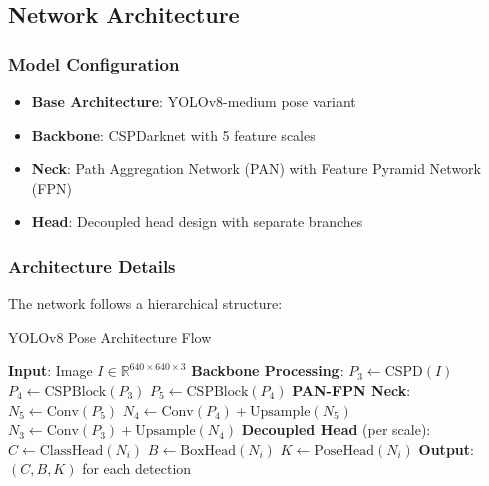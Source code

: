 \documentclass[11pt]{article}
\begin{document}
\subsection{Network Architecture}

\subsubsection{Model Configuration}

\begin{itemize}[noitemsep]
    \item \textbf{Base Architecture}: YOLOv8-medium pose variant
    \item \textbf{Backbone}: CSPDarknet with 5 feature scales 
    \item \textbf{Neck}: Path Aggregation Network (PAN) \cite{liu_path_2018} with Feature Pyramid Network (FPN) \cite{lin_feature_2017}
    \item \textbf{Head}: Decoupled head design with separate branches
\end{itemize}

\subsubsection{Architecture Details}

The network follows a hierarchical structure:

\begin{algorithm}
\caption{YOLOv8 Pose Architecture Flow}
\begin{algorithmic}[1]
\STATE \textbf{Input}: Image $I \in \mathbb{R}^{640 \times 640 \times 3}$
\STATE \textbf{Backbone Processing}:
\STATE \quad $P_3 \leftarrow \text{CSPD}(I)$ 
\STATE \quad $P_4 \leftarrow \text{CSPBlock}(P_3)$ 
\STATE \quad $P_5 \leftarrow \text{CSPBlock}(P_4)$ 
\STATE \textbf{PAN-FPN Neck}:
\STATE \quad $N_5 \leftarrow \text{Conv}(P_5)$
\STATE \quad $N_4 \leftarrow \text{Conv}(P_4) + \text{Upsample}(N_5)$
\STATE \quad $N_3 \leftarrow \text{Conv}(P_3) + \text{Upsample}(N_4)$
\STATE \textbf{Decoupled Head} (per scale):
\STATE \quad $C \leftarrow \text{ClassHead}(N_i)$ 
\STATE \quad $B \leftarrow \text{BoxHead}(N_i)$ 
\STATE \quad $K \leftarrow \text{PoseHead}(N_i)$ 
\STATE \textbf{Output}: $(C, B, K)$ for each detection
\end{algorithmic}
\end{algorithm}
\end{document}
